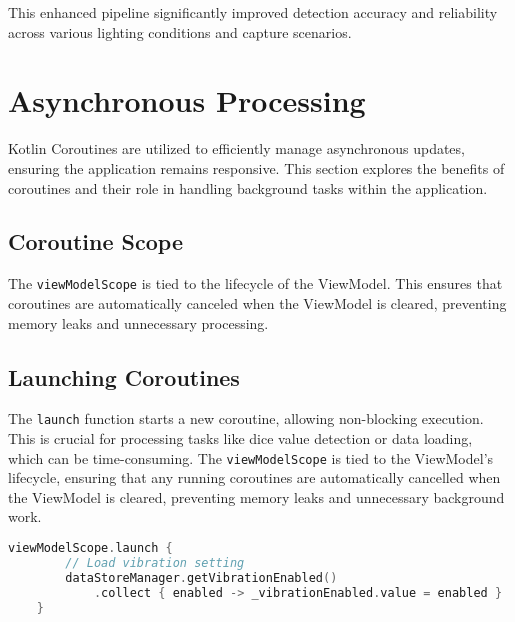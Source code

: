 This enhanced pipeline significantly improved detection accuracy and reliability across various lighting conditions and capture scenarios.

\section{Asynchronous Processing}

Kotlin Coroutines are utilized to efficiently manage asynchronous updates, ensuring the application remains responsive. This section explores the benefits of coroutines and their role in handling background tasks within the application.

\subsection{Coroutine Scope}

The \texttt{viewModelScope} is tied to the lifecycle of the ViewModel. This ensures that coroutines are automatically canceled when the ViewModel is cleared, preventing memory leaks and unnecessary processing.

\begin{figure}[ht!]
    \centering
\end{figure} 
\label{fig:lifecycle_viewmodelscope}

\subsection{Launching Coroutines}

The \texttt{launch} function starts a new coroutine, allowing non-blocking execution. This is crucial for processing tasks like dice value detection or data loading, which can be time-consuming. The \texttt{viewModelScope} is tied to the ViewModel's lifecycle, ensuring that any running coroutines are automatically cancelled when the ViewModel is cleared, preventing memory leaks and unnecessary background work.


\begin{lstlisting}[language=Kotlin, caption={Launching a Coroutine}, label=lst:launch_coroutine]
    viewModelScope.launch {
        // Load vibration setting
        dataStoreManager.getVibrationEnabled()
            .collect { enabled -> _vibrationEnabled.value = enabled }
    }
\end{lstlisting}

